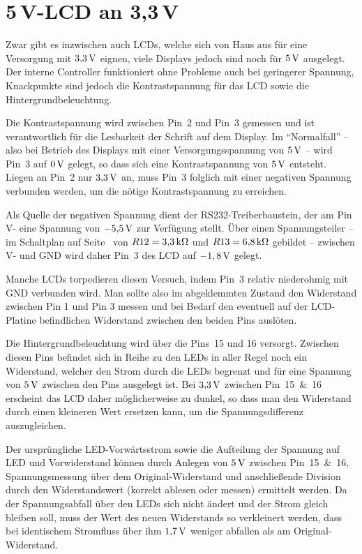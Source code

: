 \documentclass[pdftex, parskip, numbers=noenddot, toc=listof]{scrbook}
\begin{document}
	\section[5V-LCD an 3,3V]{5\,V-LCD an 3{,}3\,V}

	Zwar gibt es inzwischen auch LCDs, welche sich von Haus aus für eine Versorgung mit $\unit[3{,}3]{V}$ eignen, viele Displays jedoch sind noch für $\unit[5]{V}$ ausgelegt. Der interne Controller funktioniert ohne Probleme auch bei geringerer Spannung, Knackpunkte sind jedoch die Kontrastspannung für das LCD sowie die Hintergrundbeleuchtung.

	Die Kontrastspannung wird zwischen Pin~2 und Pin~3 gemessen und ist verantwortlich für die Lesbarkeit der Schrift auf dem Display. Im \enquote{Normalfall} -- also bei Betrieb des Displays mit einer Versorgungsspannung von $\unit[5]{V}$ -- wird Pin~3 auf $\unit[0]{V}$ gelegt, so dass sich eine Kontrastspannung von $\unit[5]{V}$ entsteht. Liegen an Pin~2 nur $\unit[3{,}3]{V}$ an, muss Pin~3 folglich mit einer negativen Spannung verbunden werden, um die nötige Kontrastspannung zu erreichen.

	Als Quelle der negativen Spannung dient der RS232-Treiberbaustein, der am Pin V- eine Spannung von $\unit[-5{,}5]{V}$ zur Verfügung stellt. Über einen Spannungsteiler -- im Schaltplan auf Seite~\pageref{fig:transmitterschematic} von $R12 = \unit[3{,}3]{k\Omega}$ und $R13 = \unit[6{,}8]{k\Omega}$ gebildet -- zwischen V- und GND wird daher Pin~3 des LCD auf $\unit[-1,8]{V}$ gelegt.

	Manche LCDs torpedieren diesen Versuch, indem Pin~3 relativ niederohmig mit GND verbunden wird. Man sollte also im abgeklemmten Zustand den Widerstand zwischen Pin 1 und Pin 3 messen und bei Bedarf den eventuell auf der LCD-Platine befindlichen Widerstand zwischen den beiden Pins auslöten.

	Die Hintergrundbeleuchtung wird über die Pins~15 und 16 versorgt. Zwischen diesen Pins befindet sich in Reihe zu den LEDs in aller Regel noch ein Widerstand, welcher den Strom durch die LEDs begrenzt und für eine Spannung von $\unit[5]{V}$ zwischen den Pins ausgelegt ist. Bei $\unit[3{,}3]{V}$ zwischen Pin~15~\&~16 erscheint das LCD daher möglicherweise zu dunkel, so dass man den Widerstand durch einen kleineren Wert ersetzen kann, um die Spannungsdifferenz auszugleichen.

	Der ursprüngliche LED-Vorwärtsstrom sowie die Aufteilung der Spannung auf LED und Vorwiderstand können durch Anlegen von $\unit[5]{V}$ zwischen Pin~15~\&~16, Spannungsmessung über dem Original-Widerstand und anschließende Division durch den Widerstandswert (korrekt ablesen oder messen) ermittelt werden. Da der Spannungsabfall über den LEDs sich nicht ändert und der Strom gleich bleiben soll, muss der Wert des neuen Widerstands so verkleinert werden, dass bei identischem Stromfluss über ihm $\unit[1{,}7]{V}$ weniger abfallen als am Original-Widerstand.
\end{document}

